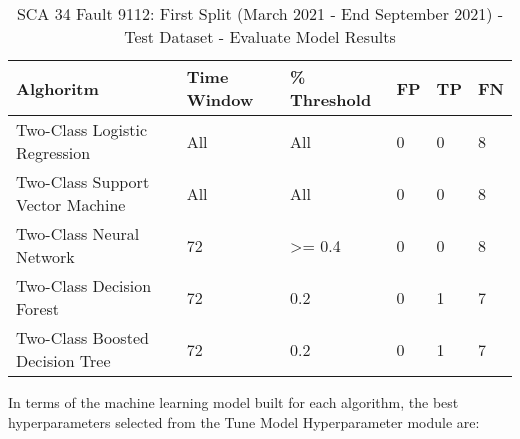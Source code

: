 \begin{table}[!ht]
    \centering
    \begin{tabular}{|l|l|l|l|l|l|}
    \hline
        Alghoritm & Time Window & \% Threshold & FP & TP & FN \\ \hline
        Two-Class Logistic Regression & All & All & 0 & 0 & 8 \\ \hline
        Two-Class Support Vector Machine & All & All & 0 & 0 & 8 \\ \hline
        Two-Class Neural Network & 72 & >= 0.4 & 0 & 0 & 8 \\ \hline
        Two-Class Decision Forest & 72 & 0.2 & 0 & 1 & 7 \\ \hline
        Two-Class Boosted Decision Tree & 72 & 0.2 & 0 & 1 & 7 \\ \hline
    \end{tabular}
    \caption{SCA 34 Fault 9112: First Split (March 2021 - End September 2021) - Test Dataset - Evaluate Model Results}
    \label{9112_SCA34_1st}
\end{table}

In terms of the machine learning model built for each algorithm, the best hyperparameters selected from the Tune Model Hyperparameter module are:

